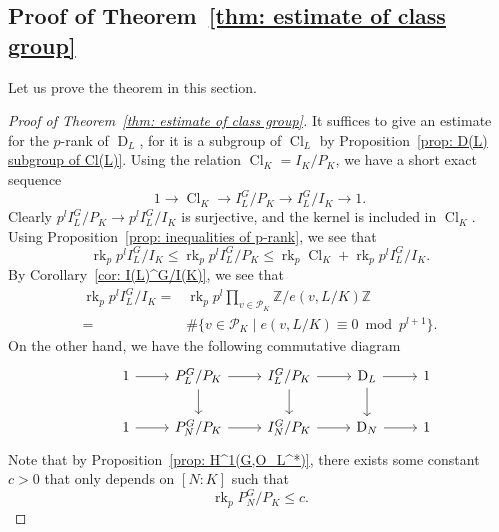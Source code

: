 \documentclass{amsart}
\numberwithin{equation}{section}
\theoremstyle{plain}
\theoremstyle{definition}
\theoremstyle{remark}
\begin{document}
\subsection{Proof of Theorem~\ref{thm: estimate of class group}}
Let us prove the theorem in this section.
\begin{proof}[Proof of Theorem~\ref{thm: estimate of class group}]
	It suffices to give an estimate for the $p$-rank of $\operatorname{D}_L$, for it is a subgroup of $\operatorname{Cl}_L$ by Proposition~\ref{prop: D(L) subgroup of Cl(L)}.
	Using the relation $\operatorname{Cl}_K=I_K/P_K$, we have a short exact sequence
	\begin{equation*}
		1\to\operatorname{Cl}_K\to I_L^G/P_K\to I_L^G/I_K\to1.
	\end{equation*}
	Clearly $p^{l} I_L^G/P_K\to p^{l}I_L^G/I_K$ is surjective, and the kernel is included in $\operatorname{Cl}_K$.
	Using Proposition~\ref{prop: inequalities of p-rank}, we see that
	\begin{equation}\label{eqn: estimate of class group 1}
		\operatorname{rk}_p p^{l}I_L^G/I_K\leq\operatorname{rk}_p p^{l}I_L^G/P_K\leq\operatorname{rk}_p\operatorname{Cl}_K+\operatorname{rk}_p p^{l}I_L^G/I_K.
	\end{equation}
	By Corollary~\ref{cor: I(L)^G/I(K)}, we see that
	\begin{equation}\label{eqn: estimate of class group 2}
		\begin{aligned}
			\operatorname{rk}_p p^{l}I_L^G/I_K=&\operatorname{rk}_p p^{l} \prod_{v\in\mathcal{P}_K}\mathbb{Z}/e(v,L/K)\mathbb{Z}\\
			=&\#\{v\in\mathcal{P}_K\mid e(v,L/K)\equiv0\bmod{p^{l+1}}\}.
		\end{aligned}		
	\end{equation}
	On the other hand, we have the following commutative diagram
	\begin{equation*}
		\begin{tikzcd}
			&1\arrow[r]&P_L^G/P_K\arrow[r]\arrow[d]&I_L^G/P_K\arrow[r]\arrow[d]&\operatorname{D}_L\arrow[r]\arrow[d]&1\\
			&1\arrow[r]&P_N^G/P_K\arrow[r]&I_N^G/P_K\arrow[r]&\operatorname{D}_N\arrow[r]&1
		\end{tikzcd}
	\end{equation*}
	Note that by Proposition~\ref{prop: H^1(G,O_L^*)}, there exists some constant $c>0$ that only depends on $[N:K]$ such that
	\begin{equation*}
		\operatorname{rk}_p P_N^G/P_K\leq c.
	\end{equation*}

\end{proof}
\end{document}
